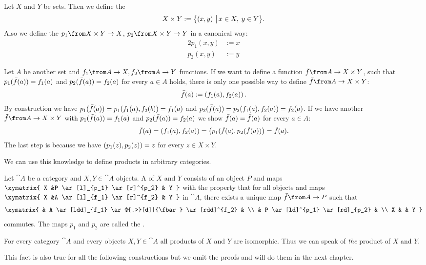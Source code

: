 \begin{example}
  \label{ex:prod:cart}
  Let $X$ and $Y$ be sets.
  Then we define the 
  $$X \times Y := \bigl \{ \left( x , y \right) \,\big|\, x \in X, \; y \in Y \bigr \}.$$
  Also we define the  $p_1 \from X \times Y \to X$, $p_2 \from X \times Y \to Y$ in a canonical way:
  \begin{alignat*}{2}
    p_1(x,y) &:= x \\
    p_2(x,y) &:= y
  \end{alignat*}

  Let $A$ be another set and $f_1 \from A \to X, f_2 \from A \to Y$ functions.
  If we want to define a function $\fbar \from A \to X \times Y$, such that
  $p_1(\bar{f}(a)) = f_1(a)$ and $p_2(\bar{f}(a)) = f_2(a)$ for every $a \in A$ holds,
  there is only one possible way to define $\fbar \from A \to X \times Y$:
  $$\bar{f}(a) := \left( f_1(a) , f_2(a) \right).$$
  By construction we have $p_1(\bar{f}(a)) = p_1(f_1(a), f_2(b)) = f_1(a)$ and $p_2(\bar{f}(a)) = p_2(f_1(a), f_2(a)) = f_2(a)$.
  If we have another $\ftilde \from A \to X \times Y$ with $p_1(\tilde{f}(a)) = f_1(a)$ and $p_2(\tilde{f}(a)) = f_2(a)$ we show $\bar{f}(a) = \tilde{f}(a)$ for every $a \in A$:
  $$\bar{f}(a) = \left( f_1(a) , f_2(a) \right) = \left( p_1(\tilde{f}(a) , p_2(\tilde{f}(a)) \right) = \tilde{f}(a).$$
  The last step is because we have $\left( p_1(z) , p_2(z) \right) = z$ for every $z \in X \times Y$.
\end{example}

We can use this knowledge to define products in arbitrary categories.

\begin{definition}[Product]
  \label{def:prod}
  Let $\cat{A}$ be a category and $X, Y \in \cat{A}$ objects.
  A  of $X$ and $Y$ consists of an object $P$ and maps
  $ \xymatrix{
    X &P \ar[l]_{p_1} \ar[r]^{p_2} & Y
  } $
  with the property that for all objects and maps
  $ \xymatrix{
    X &A \ar[l]_{f_1} \ar[r]^{f_2} & Y
  } $
  in $\cat{A}$, there exists a unique map $\fbar\from A \to P$ such that
  \[ \xymatrix{
    & A \ar[ldd]_{f_1} \ar@{.>}[d]|{\fbar} \ar[rdd]^{f_2} & \\
    & P \ar[ld]^{p_1} \ar[rd]_{p_2} & \\
    X & & Y
  } \]
  commutes. The maps $p_1$ and $p_2$ are called the .
\end{definition}

\begin{lemma}
  \label{lem:prod:uniq}
  For every category $\cat{A}$ and every objects $X, Y \in \cat{A}$
  all products of $X$ and $Y$ are isomorphic. Thus we can speak of \emph{the} product of $X$ and $Y$.

  This fact is also true for all the following constructions but we omit the proofs and will do them in the next chapter.
\end{lemma}

